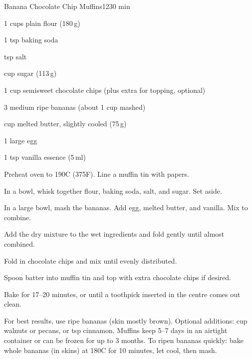\begin{recipebox}{Banana Chocolate Chip Muffins}{12}{30 min}
\begin{ingredients}
  \item 1 cups plain flour (180\,g)
  \item 1 tsp baking soda
  \item {} tsp salt
  \item {} cup sugar (113\,g)
  \item 1 cup semisweet chocolate chips (plus extra for topping, optional)
  \item 3 medium ripe bananas (about 1 cup mashed)
  \item {} cup melted butter, slightly cooled (75\,g)
  \item 1 large egg
  \item 1 tsp vanilla essence (5\,ml)
\end{ingredients}

\begin{method}
  \item Preheat oven to 190\degree C (375\degree F). Line a muffin tin with papers.  
  \item In a bowl, whisk together flour, baking soda, salt, and sugar. Set aside.  
  \item In a large bowl, mash the bananas. Add egg, melted butter, and vanilla. Mix to combine.  
  \item Add the dry mixture to the wet ingredients and fold gently until almost combined.  
  \item Fold in chocolate chips and mix until evenly distributed.  
  \item Spoon batter into muffin tin and top with extra chocolate chips if desired.  
  \item Bake for 17–20 minutes, or until a toothpick inserted in the centre comes out clean.  
\end{method}

\begin{notes}
For best results, use ripe bananas (skin mostly brown).  
Optional additions:  cup walnuts or pecans, or  tsp cinnamon.  
Muffins keep 5–7 days in an airtight container or can be frozen for up to 3 months.  
To ripen bananas quickly: bake whole bananas (in skins) at 180\degree C for 10 minutes, let cool, then mash.  
\end{notes}
\end{recipebox}
